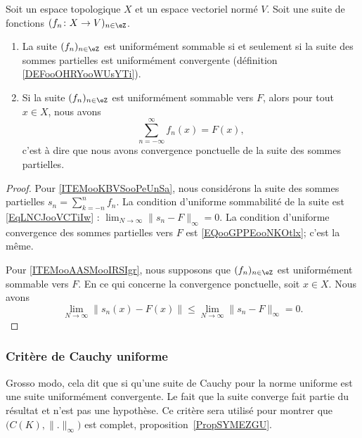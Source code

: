 \begin{proposition}	\label{PROPooYLCRooOXsOkb}
	Soit un espace topologique \( X\) et un espace vectoriel normé \( V\). Soit une suite de fonctions \( (f_n \colon X\to V )_{n\in \eZ}\).
	\begin{enumerate}
		\item		\label{ITEMooKBVSooPeUnSa}
		      La suite \( (f_n)_{n\in \eZ}\) est uniformément sommable si et seulement si la suite des sommes partielles est uniformément convergente (définition \ref{DEFooOHRYooWUsYTi}).
		\item		\label{ITEMooAASMooIRSIgr}
		      Si la suite \( (f_n)_{n\in\eZ}\) est uniformément sommable vers \( F\), alors pour tout \( x\in X\), nous avons
		      \begin{equation}
			      \sum_{n=-\infty}^{\infty}f_n(x)=F(x),
		      \end{equation}
		      c'est à dire que nous avons convergence ponctuelle de la suite des sommes partielles.
	\end{enumerate}
\end{proposition}

\begin{proof}
	Pour \ref{ITEMooKBVSooPeUnSa}, nous considérons la suite des sommes partielles \( s_n=\sum_{k=-n}^nf_n\). La condition d'uniforme sommabilité de la suite est \eqref{EqLNCJooVCTiIw} : \( \lim_{N\to \infty}\| s_n-F \|_{\infty}=0\). La condition d'uniforme convergence des sommes partielles vers \( F\) est \eqref{EQooGPPEooNKOtlx}; c'est la même.

	Pour \ref{ITEMooAASMooIRSIgr}, nous supposons que \( (f_n)_{n\in \eZ}\) est uniformément sommable vers \( F\). En ce qui concerne la convergence ponctuelle, soit \( x\in X\). Nous avons
	\begin{equation}
		\lim_{N\to \infty}\| s_n(x)-F(x) \|\leq \lim_{N\to \infty}\| s_n-F \|_{\infty}=0.
	\end{equation}
\end{proof}


\subsubsection{Critère de Cauchy uniforme}

Grosso modo, cela dit que si qu'une suite de Cauchy pour la norme uniforme est une suite uniformément convergente. Le fait que la suite converge fait partie du résultat et n'est pas une hypothèse. Ce critère sera utilisé pour montrer que \( \big( C(K),\| . \|_{\infty} \big)\) est complet, proposition~\ref{PropSYMEZGU}.

